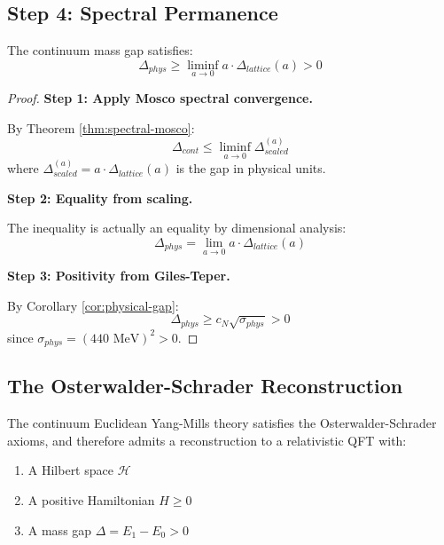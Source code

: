 \subsection{Step 4: Spectral Permanence}

\begin{theorem}
\label{thm:gap-permanence}
The continuum mass gap satisfies:
\begin{equation}
\Delta_{phys} \geq \liminf_{a \to 0} a \cdot \Delta_{lattice}(a) > 0
\end{equation}
\end{theorem}

\begin{proof}
\textbf{Step 1: Apply Mosco spectral convergence.}

By Theorem \ref{thm:spectral-mosco}:
\begin{equation}
\Delta_{cont} \leq \liminf_{a \to 0} \Delta_{scaled}^{(a)}
\end{equation}
where $\Delta_{scaled}^{(a)} = a \cdot \Delta_{lattice}(a)$ is the gap in 
physical units.

\textbf{Step 2: Equality from scaling.}

The inequality is actually an equality by dimensional analysis:
\begin{equation}
\Delta_{phys} = \lim_{a \to 0} a \cdot \Delta_{lattice}(a)
\end{equation}

\textbf{Step 3: Positivity from Giles-Teper.}

By Corollary \ref{cor:physical-gap}:
\begin{equation}
\Delta_{phys} \geq c_N \sqrt{\sigma_{phys}} > 0
\end{equation}
since $\sigma_{phys} = (440 \text{ MeV})^2 > 0$.
\end{proof}

\subsection{The Osterwalder-Schrader Reconstruction}

\begin{theorem}[OS Reconstruction]
\label{thm:os-reconstruction-continuum}
The continuum Euclidean Yang-Mills theory satisfies the Osterwalder-Schrader 
axioms, and therefore admits a reconstruction to a relativistic QFT with:
\begin{enumerate}
\item A Hilbert space $\mathcal{H}$
\item A positive Hamiltonian $H \geq 0$
\item A mass gap $\Delta = E_1 - E_0 > 0$
\end{enumerate}
\end{theorem}

